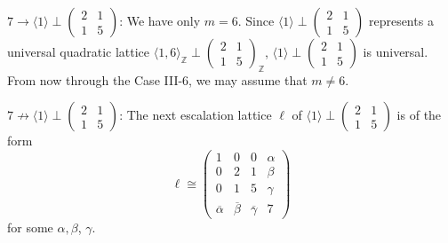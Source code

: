 \documentclass[a4paper,10pt,reqno]{amsart}
\begin{document}
{} $7 \to {\langle {1} \rangle}\perp{\begin{pmatrix}
  2 & 1 \\
  1 & 5
\end{pmatrix}}$: We have only $m=6$. Since
${\langle {1} \rangle}\perp{\begin{pmatrix}
  2 & 1 \\
  1 & 5
\end{pmatrix}}$ represents a universal quadratic lattice ${\langle {1,6} \rangle}_{\mathbb{Z}} \perp
{\begin{pmatrix}
  2 & 1 \\
  1 & 5
\end{pmatrix}}_{\mathbb{Z}}$, ${\langle {1} \rangle}\perp{\begin{pmatrix}
  2 & 1 \\
  1 & 5
\end{pmatrix}}$ is universal. From now through the Case III-6, we
may assume that $m \ne 6$.

{} $7 \not\to {\langle {1} \rangle}\perp{\begin{pmatrix}
  2 & 1 \\
  1 & 5
\end{pmatrix}}$: The next
escalation lattice $\ell$ of ${\langle {1} \rangle}\perp{\begin{pmatrix}
  2 & 1 \\
  1 & 5
\end{pmatrix}}$ is of
the form
\[
    \ell \cong
    \begin{pmatrix}
        1 & 0 & 0 & \alpha \\
        0 & 2 & 1 & \beta \\
        0 & 1 & 5 & \gamma \\
        {\overline{{\alpha}}} & {\overline{{\beta}}} & {\overline{{\gamma}}} & 7
    \end{pmatrix}
\]
for some $\alpha, \beta$, $\gamma$.
\end{document}
